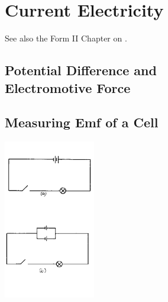 \section{Current Electricity} 
See also the Form II Chapter on .

\begin{multicols}{2}


\section*{Potential Difference and \hfill \\ Electromotive Force}


\subsection{Measuring Emf of a Cell}

\begin{center}
\includegraphics[width=0.3\textwidth]{./img/source/measuring-emf.png}
\end{center}


\end{multicols}
